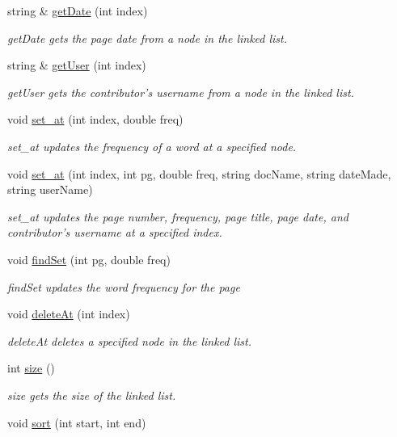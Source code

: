 \begin{DoxyCompactItemize}
string \& \hyperlink{class_linked_list_a49761c9b8dd1dc1df7a56b0a3536a15d}{get\-Date} (int index)
\begin{DoxyCompactList}\small\item\em get\-Date gets the page date from a node in the linked list. \end{DoxyCompactList}\item 
string \& \hyperlink{class_linked_list_ad88d540fff6aea9502372fc21035e404}{get\-User} (int index)
\begin{DoxyCompactList}\small\item\em get\-User gets the contributor's username from a node in the linked list. \end{DoxyCompactList}\item 
void \hyperlink{class_linked_list_a7bfa0c7ef3608c772d8837226fa0baca}{set\-\_\-at} (int index, double freq)
\begin{DoxyCompactList}\small\item\em set\-\_\-at updates the frequency of a word at a specified node. \end{DoxyCompactList}\item 
void \hyperlink{class_linked_list_a1d13e00736ede314d40f26a64769cc35}{set\-\_\-at} (int index, int pg, double freq, string doc\-Name, string date\-Made, string user\-Name)
\begin{DoxyCompactList}\small\item\em set\-\_\-at updates the page number, frequency, page title, page date, and contributor's username at a specified index. \end{DoxyCompactList}\item 
void \hyperlink{class_linked_list_aed2890ca9479d953248e024babee04f3}{find\-Set} (int pg, double freq)
\begin{DoxyCompactList}\small\item\em find\-Set updates the word frequency for the page \end{DoxyCompactList}\item 
void \hyperlink{class_linked_list_a3429db79356a0203d8c50057cb76a03b}{delete\-At} (int index)
\begin{DoxyCompactList}\small\item\em delete\-At deletes a specified node in the linked list. \end{DoxyCompactList}\item 
int \hyperlink{class_linked_list_a4224bd8bf5f18b7b6f9fa66ee2c35702}{size} ()
\begin{DoxyCompactList}\small\item\em size gets the size of the linked list. \end{DoxyCompactList}\item 
\hypertarget{class_linked_list_ad6fdfc5ff2d9b4209ac3104402676574}{void \hyperlink{class_linked_list_ad6fdfc5ff2d9b4209ac3104402676574}{sort} (int start, int end)}\label{class_linked_list_ad6fdfc5ff2d9b4209ac3104402676574}


\end{DoxyCompactItemize}
